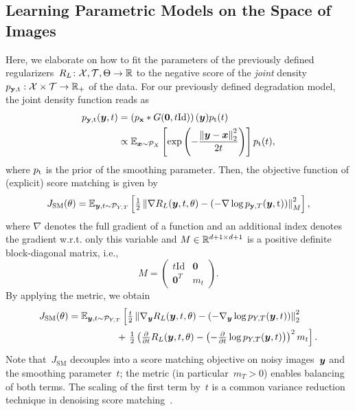 \documentclass{article} %
\theoremstyle{plain}
\theoremstyle{definition}
\theoremstyle{remark}
\newcommand{\X}{\mathcal{X}}
\newcommand{\T}{\mathcal{T}}
\newcommand{\id}{\mathrm{Id}}
\newcommand{\norm}[1]{\left\Vert#1\right\Vert}
\renewcommand{\vec}[1]{\mathbf{#1}}
\newcommand{\dist}[1]{\mathcal{P}_{#1}}
\newcommand{\pdf}[1]{p_{#1}}
\begin{document}
\subsection{Learning Parametric Models on the Space of Images}
Here, we elaborate on how to fit the parameters of the previously defined regularizers~$R_L\colon\X,\T,\Theta\to\R$ to the negative score of the \emph{joint} density~$\pdf{\rvy,\rt}:\X\times\T\to\R_+$ of the data.
For our previously defined degradation model, the joint density function reads as
\begin{align*}
\pdf{\rvy,\rt}(\vy,t) &= \left(\pdf{\rvx}\ast G(\vec{0},t\id)\right)(\vy) \pdf{\rt}(t)\\
&\propto \E_{\vx\sim\dist{X}}\left[\exp\left(-\frac{\norm{\vy-\vx}_2^2}{2 t}\right)\right] \pdf{\rt}(t),
\end{align*}
where $\pdf{\rt}$ is the prior of the smoothing parameter.
Then, the objective function of (explicit) score matching is given by
\begin{align} \label{eq:jsm}
J_\mathrm{SM}(\theta) = \E_{\vy,t\sim\dist{Y,T}}\left[\tfrac12\norm{\nabla R_L(\vy,t,\theta) -\left(- \nabla\log p_{\rvy,T}(\vy,\rt)\right)}_M^2\right],
\end{align}
where $\nabla$ denotes the full gradient of a function and an additional index denotes the gradient w.r.t. only this variable and 
$M\in\mathbb{R}^{d+1\times d+1}$ is a positive definite block-diagonal matrix, i.e.,
\[
M = \begin{pmatrix}
t\id & \vec{0} \\
\vec{0}^T & m_t
\end{pmatrix}.
\]
By applying the metric, we obtain
\begin{align}
J_\mathrm{SM}(\theta) &=\E_{\vy,t\sim\dist{Y,T}}\left[\tfrac{t}{2}\norm{\nabla_\vy R_L(\vy,t,\theta) -\left(- \nabla_\vy\log p_{Y,T}(\vy,t)\right)}_2^2 \right.\label{eq:jsmParts}\\
&\hspace{5em}+ \left.\tfrac12\left(\tfrac{\partial}{\partial t}R_L(\vy,t,\theta) -\left(-\tfrac{\partial}{\partial t}\log p_{Y,T}(\vy,t)\right)\right)^2m_t\right].\notag
\end{align}
Note that~$J_\mathrm{SM}$ decouples into a score matching objective on noisy images~${\bm{y}}$ and the smoothing parameter~$t$; the metric (in particular~$m_T>0$) enables balancing of both terms.
The scaling of the first term by~$t$ is a common variance reduction technique in denoising score matching~\citep{SoEr19,HuLi21}.
\end{document}
